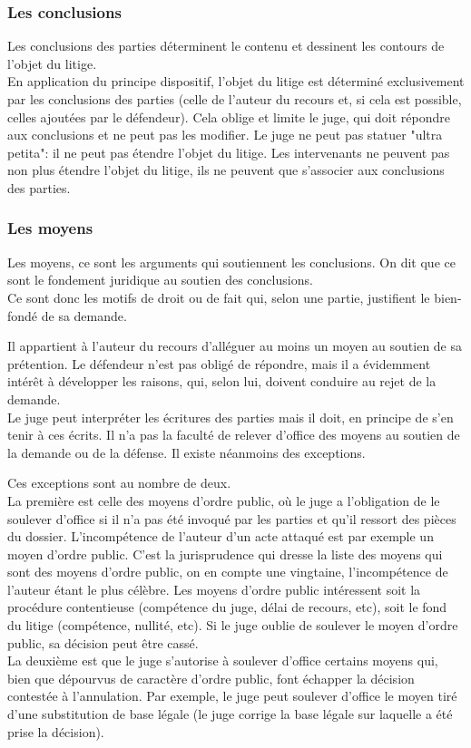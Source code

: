 \documentclass[10pt, a4paper, openany]{book}
\begin{document}
\subsubsection{Les conclusions}

Les conclusions des parties déterminent le contenu et dessinent les contours de l'objet du litige. \\
En application du principe dispositif, l'objet du litige est déterminé exclusivement par les conclusions des parties (celle de l'auteur du recours et, si cela est possible, celles ajoutées par le défendeur). Cela oblige et limite le juge, qui doit répondre aux conclusions et ne peut pas les modifier. Le juge ne peut pas statuer "ultra petita": il ne peut pas étendre l'objet du litige. Les intervenants ne peuvent pas non plus étendre l'objet du litige, ils ne peuvent que s'associer aux conclusions des parties.

\subsubsection{Les moyens}

Les moyens, ce sont les arguments qui soutiennent les conclusions. On dit que ce sont le fondement juridique au soutien des conclusions. \\
Ce sont donc les motifs de droit ou de fait qui, selon une partie, justifient le bien-fondé de sa demande. 


Il appartient à l'auteur du recours d'alléguer au moins un moyen au soutien de sa prétention. Le défendeur n'est pas obligé de répondre, mais il a évidemment intérêt à développer les raisons, qui, selon lui, doivent conduire au rejet de la demande. \\
Le juge peut interpréter les écritures des parties mais il doit, en principe de s'en tenir à ces écrits. Il n'a pas la faculté de relever d'office des moyens au soutien de la demande ou de la défense. Il existe néanmoins des exceptions.


Ces exceptions sont au nombre de deux. \\
La première est celle des moyens d'ordre public, où le juge a l'obligation de le soulever d'office si il n'a pas été invoqué par les parties et qu'il ressort des pièces du dossier. L'incompétence de l'auteur d'un acte attaqué est par exemple un moyen d'ordre public. C'est la jurisprudence qui dresse la liste des moyens qui sont des moyens d'ordre public, on en compte une vingtaine, l'incompétence de l'auteur étant le plus célèbre. Les moyens d'ordre public intéressent soit la procédure contentieuse (compétence du juge, délai de recours, etc), soit le fond du litige (compétence, nullité, etc). Si le juge oublie de soulever le moyen d'ordre public, sa décision peut être cassé. \\
La deuxième est que le juge s'autorise à soulever d'office certains moyens qui, bien que dépourvus de caractère d'ordre public, font échapper la décision contestée à l'annulation. Par exemple, le juge peut soulever d'office le moyen tiré d'une substitution de base légale (le juge corrige la base légale sur laquelle a été prise la décision). 
\end{document}
